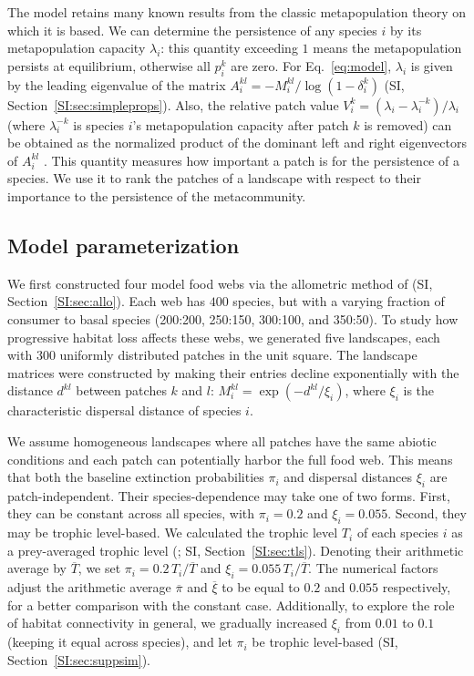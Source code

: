 \documentclass[11pt]{article}
\newcommand{\SI}{SI}
\begin{document}
The model retains many known results from the classic metapopulation theory on which it is based. We can determine the persistence of any species $i$ by its metapopulation capacity $\lambda_i$: this quantity exceeding $1$ means the metapopulation persists at equilibrium, otherwise all $p_i^k$ are zero. For Eq.~\ref{eq:model}, $\lambda_i$ is given by the leading eigenvalue of the matrix $A_i^{kl} = -M_i^{kl} / \log(1 - \delta_i^k)$ (\SI, Section~\ref{SI:sec:simpleprops}). Also, the relative patch value $V_i^k = (\lambda_i - \lambda_i^{-k})/\lambda_i$ (where $\lambda_i^{-k}$ is species $i$'s metapopulation capacity after patch $k$ is removed) can be obtained as the normalized product of the dominant left and right eigenvectors of $A_i^{kl}$ \citep{OvaskainenHanski2001}. This quantity measures how important a patch is for the persistence of a species. We use it to rank the patches of a landscape with respect to their importance to the persistence of the metacommunity.

\subsection{Model parameterization}

We first constructed four model food webs via the allometric method of \citet{Schneider2016} (\SI, Section~\ref{SI:sec:allo}). Each web has $400$ species, but with a varying fraction of consumer to basal species (200:200, 250:150, 300:100, and 350:50). To study how progressive habitat loss affects these webs, we generated five landscapes, each with $300$ uniformly distributed patches in the unit square. The landscape matrices were constructed by making their entries decline exponentially with the distance $d^{kl}$ between patches $k$ and $l$: $M_i^{kl} = \exp(-d^{kl} / \xi_i)$, where $\xi_i$ is the characteristic dispersal distance of species $i$.

We assume homogeneous landscapes where all patches have the same abiotic conditions and each patch can potentially harbor the full food web. This means that both the baseline extinction probabilities $\pi_i$ and dispersal distances $\xi_i$ are patch-independent. Their species-dependence may take one of two forms. First, they can be constant across all species, with $\pi_i = 0.2$ and $\xi_i = 0.055$. Second, they may be trophic level-based. We calculated the trophic level $T_i$ of each species $i$  as a prey-averaged trophic level (\citealp{WilliamsMartinez2004}; \SI, Section~\ref{SI:sec:tls}). Denoting their arithmetic average by $\overline{T}$, we set $\pi_i = 0.2 \, T_i / \overline{T}$ and $\xi_i = 0.055 \, T_i / \overline{T}$. The numerical factors adjust the arithmetic average $\overline{\pi}$ and $\overline{\xi}$ to be equal to $0.2$ and $0.055$ respectively, for a better comparison with the constant case. Additionally, to explore the role of habitat connectivity in general, we gradually increased $\xi_i$ from $0.01$ to $0.1$ (keeping it equal across species), and let $\pi_i$ be trophic level-based (\SI, Section~\ref{SI:sec:suppsim}).
\end{document}
